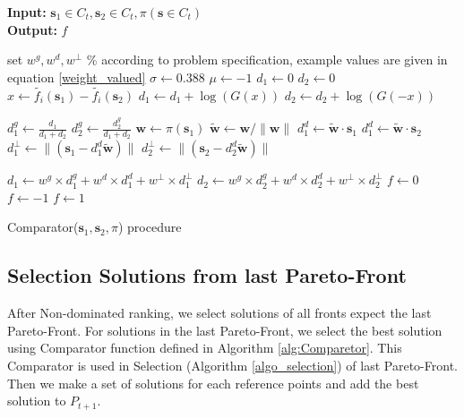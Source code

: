 \documentclass[letterpaper, 10 pt, conference]{ieeeconf}  %
\begin{document}
\begin{algorithm}[!ht]
	
 	\textbf{Input:} $\textbf{s}_1 \in C_t,\textbf{s}
_2 \in C_t,\pi(\textbf{s} \in C_t)$\\
 	\textbf{Output:} $f$
	
 	\begin{algorithmic}[1]
    \State set $w^g,w^d,w^{\perp}$ \% according to problem specification, example values are given in equation \ref{weight_valued}
    \State $\sigma \gets 0.388$
    \State $\mu \gets -1$
    \State $d_1 \gets 0$
    \State $d_2 \gets 0$
    \State $x \gets \tilde{f_i}(\mathbf{s}_1)-\tilde{f_i}(\mathbf{s}_2) $
    \State $d_1 \gets d_1+\log(G(x))$
     \State $d_2 \gets d_2+\log(G(-x))$
    
    \EndFor
    \State $d_{1}^g \gets \frac{d_1} {d_1+d_2}$
    \State $d_{2}^g \gets \frac{d_{2}^g} {d_1+d_2}$
    \State $\mathbf{w} \gets \pi(\mathbf{s}_1)$
    \State $\mathbf{\tilde{w}} \gets \mathbf{w} / \parallel \mathbf{w} \parallel$
    \State $d_{1}^d \gets \mathbf{\tilde{w}} \cdot \mathbf{s}_1$
    \State $d_{1}^d \gets \mathbf{\tilde{w}} \cdot \mathbf{s}_2$
    \State $d^{\perp}_1 \gets \parallel(\mathbf{s}_1-d_1^d \mathbf{\tilde{w}}) \parallel $
        \State $d^{\perp}_2 \gets \parallel(\mathbf{s}_2-d_2^d \mathbf{\tilde{w}}) \parallel $
        
        \State $d_1 \gets w^g\times d^{g}_1+ w^d \times d^{d}_1 + w^{\perp} \times d^{\perp}_1 $
        \State $d_2 \gets w^g\times d^{g}_2+ w^d \times d^{d}_2 + w^{\perp} \times d^{\perp}_2 $
         \State $f \gets 0$
    \State $f \gets -1$
    \EndIf
     \State $f \gets 1$
    \EndIf
   
    
    
		
	\end{algorithmic} 
	
	\caption{Comparator($\textbf{s}_1,\textbf{s}_2,\pi$) procedure}
	
 	\label{alg:Comparetor}
 \end{algorithm}





\subsection{Selection Solutions from  last Pareto-Front}
After Non-dominated ranking, we select solutions of all fronts expect the last Pareto-Front. For solutions in the last Pareto-Front, we select the best solution using Comparator function defined in Algorithm \ref{alg:Comparetor}. This Comparator is used in Selection (Algorithm \ref{algo_selection}) of last Pareto-Front. 
Then we make a set of solutions for each reference points and add the best solution to $P_{t+1} $.
  
\end{document}
